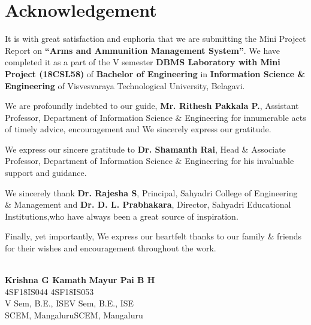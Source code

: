 \documentclass[12pt,a4paper]{report}
\begin{document}
\chapter*{Acknowledgement}
It is with great satisfaction and euphoria that we are submitting the Mini Project Report on \textbf{“Arms and Ammunition Management System”}. We have completed it as a part of the V semester \textbf{DBMS Laboratory with Mini Project (18CSL58)} of \textbf{Bachelor of Engineering} in \textbf{Information Science \& Engineering} of Visvesvaraya Technological University, Belagavi.
\par
\vspace{0.15in}
\noindent We are profoundly indebted to our guide, \textbf{Mr. Rithesh Pakkala P.}, Assistant Professor, Department of Information Science \& Engineering for innumerable acts of timely advice, encouragement and We sincerely express our gratitude.
\par
\vspace{0.15in}
\noindent We express our sincere gratitude to \textbf{Dr. Shamanth Rai}, Head \& Associate Professor, Department of Information Science \& Engineering for his invaluable support and guidance.
\par
\vspace{0.15in}
\noindent We sincerely thank  \textbf{Dr. Rajesha S}, Principal, Sahyadri College of Engineering \& Management  and \textbf{Dr. D. L. Prabhakara}, Director, Sahyadri Educational Institutions,who have always been a great source of inspiration.
\par
\vspace{0.15in}
\noindent Finally, yet importantly, We express our heartfelt thanks to our family \& friends for their wishes and encouragement throughout the work.
\\
\\

\begin{flushright}
\textbf{Krishna G Kamath}\hspace{7.5cm} \textbf{Mayur Pai B H}\\
\hspace{0.25in}4SF18IS044 \hspace{3.38in}4SF18IS053\\
V Sem, B.E., ISE\hspace{7.7cm}V Sem, B.E., ISE\\
SCEM, Mangaluru\hspace{7.5cm}SCEM, Mangaluru\\
\end{flushright}
\end{document}
